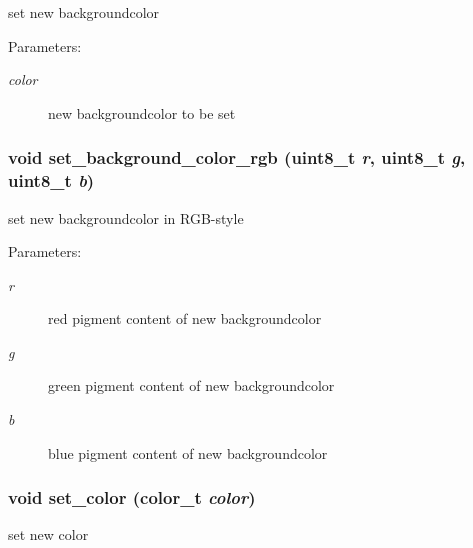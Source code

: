 set new backgroundcolor 

\begin{Desc}
\item[Parameters:]
\begin{description}
\item[{\em color}]new backgroundcolor to be set \end{description}
\end{Desc}
\hypertarget{group__hgdi__api_g77a2bc7d1449fa4175ad4655437f90df}{
\subsubsection[{set\_\-background\_\-color\_\-rgb}]{\setlength{\rightskip}{0pt plus 5cm}void set\_\-background\_\-color\_\-rgb (uint8\_\-t {\em r}, \/  uint8\_\-t {\em g}, \/  uint8\_\-t {\em b})}}
\label{group__hgdi__api_g77a2bc7d1449fa4175ad4655437f90df}


set new backgroundcolor in RGB-style 

\begin{Desc}
\item[Parameters:]
\begin{description}
\item[{\em r}]red pigment content of new backgroundcolor \item[{\em g}]green pigment content of new backgroundcolor \item[{\em b}]blue pigment content of new backgroundcolor \end{description}
\end{Desc}
\hypertarget{group__hgdi__api_gda96baaa4dc5ab037974f7045c9a3868}{
\subsubsection[{set\_\-color}]{\setlength{\rightskip}{0pt plus 5cm}void set\_\-color ({\bf color\_\-t} {\em color})}}
\label{group__hgdi__api_gda96baaa4dc5ab037974f7045c9a3868}


set new color 

